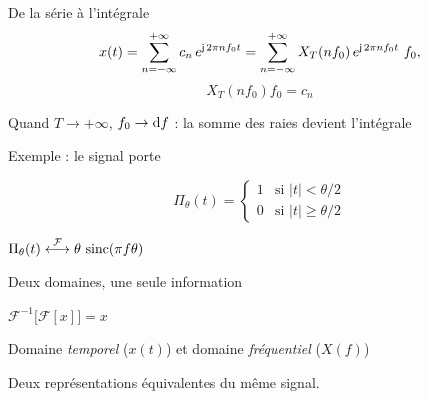 \documentclass[aspectratio=43,10pt]{beamer}
\newcommand{\highlight}[1]{{\color{niceblue}\emph{#1}}}
\newcommand{\tf}{\overset{\mathcal F}{\longleftrightarrow}}
\newcommand{\slidefig}[2]{%
\begin{center}
\resizebox{#1}{!}{}
\end{center}
}
\begin{document}
\begin{frame}{De la série à l'intégrale}
    \[
        x(t) = \sum_{n=-\infty}^{+\infty} c_n\,e^{\operatorname{\mathsf{j}}2\pi nf_0 t}
        = \sum_{n=-\infty}^{+\infty} X_T(nf_0)\,e^{\operatorname{\mathsf{j}}2\pi nf_0 t}\ f_0,
    \]
    $$
     X_T(nf_0) f_0 = c_n
    $$
    \slidefig{0.68\textwidth}{riemann-sum.tex}
    \begin{center}
        \small Quand $T\to+\infty$, $f_0\to{\rm d} f$ : la somme des raies
        devient l'intégrale
    \end{center}
\end{frame}

\begin{frame}{Exemple : le signal porte}
    \begin{definition}
        $$
            \Pi_\theta(t) = \begin{cases} 1 & \text{si } |t|<\theta/2 \\ 0 & \text{si } |t|\geq\theta/2 \end{cases}
        $$
    \end{definition}
    \slidefig{\textwidth}{porte-sinc.tex}
    \begin{center}
        $\Pi_\theta(t) \tf \theta\,\sinc(\pi f\theta)$ 
    \end{center}
\end{frame}

\begin{frame}{Deux domaines, une seule information}
    \begin{center}
        \Large $\mathcal F^{-1}\big[\mathcal F[x]\big] = x$
    \end{center}
    \vspace{1em}
    \begin{center}
        \small Domaine \highlight{temporel} ($x(t)$) et domaine
        \highlight{fréquentiel} ($X(f)$) 
        
        Deux représentations
        équivalentes du même signal.
    \end{center}
\end{frame}
\end{document}
